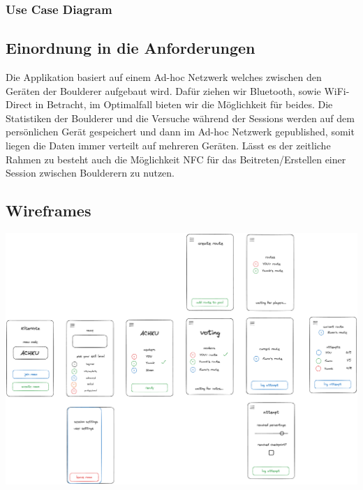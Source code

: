 \documentclass[11pt,a4paper,headsepline,footsepline,bibliography=totocnumbered]{article}
\begin{document}
    \subsubsection{Use Case Diagram}

  \subsection{Einordnung in die Anforderungen}  
    \par  
      Die Applikation basiert auf einem Ad-hoc Netzwerk welches zwischen den Geräten der Boulderer aufgebaut wird.
      Dafür ziehen wir Bluetooth, sowie WiFi-Direct in Betracht, im Optimalfall bieten wir die Möglichkeit für beides.
      Die Statistiken der Boulderer und die Versuche während der Sessions werden auf dem persönlichen Gerät gespeichert und dann im Ad-hoc Netzwerk gepublished, somit liegen die Daten immer verteilt auf mehreren Geräten.
      Lässt es der zeitliche Rahmen zu besteht auch die Möglichkeit NFC für das Beitreten/Erstellen einer Session zwischen Boulderern zu nutzen.
    
  \subsection{Wireframes}
    \includegraphics[width=\textwidth]{pictures/KilterVote_GUI.png}
\end{document}
